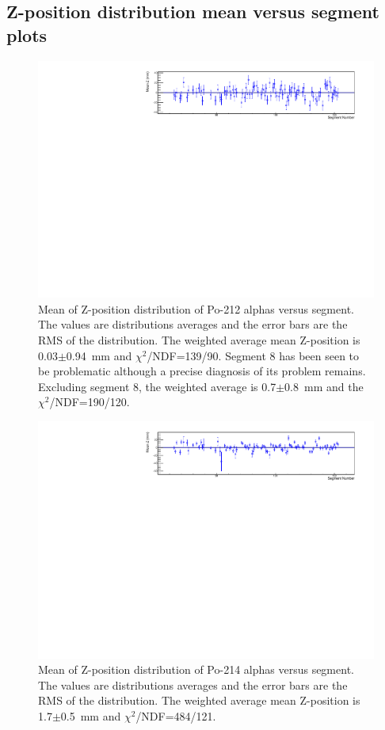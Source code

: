 \subsection{Z-position distribution mean versus segment plots}
\begin{figure}[!h]
	\centering
	\includegraphics[width=1.05\textwidth]{figures/PubBiPo212meanZvsCell.pdf}
	\caption{\label{fig:meanZvsCell212}Mean of Z-position distribution of Po-212 alphas versus segment. The values are distributions averages and the error bars are the RMS of the distribution. The weighted average mean Z-position is 0.03$\pm$0.94~mm and $\chi^2$/NDF=139/90. Segment 8 has been seen to be problematic although a precise diagnosis of its problem remains. Excluding segment 8, the weighted average is 0.7$\pm$0.8~mm and the $\chi^2$/NDF=190/120.  }
\end{figure}
\begin{figure}[!h]
	\centering
	\includegraphics[width=1.05\textwidth]{figures/PubBiPo214meanZvsCell.pdf}
	\caption{\label{fig:meanZvsCell214}Mean of Z-position distribution of Po-214 alphas versus segment. The values are distributions averages and the error bars are the RMS of the distribution. The weighted average mean Z-position is 1.7$\pm$0.5~mm and $\chi^2$/NDF=484/121.}
\end{figure}
\clearpage
\newpage
